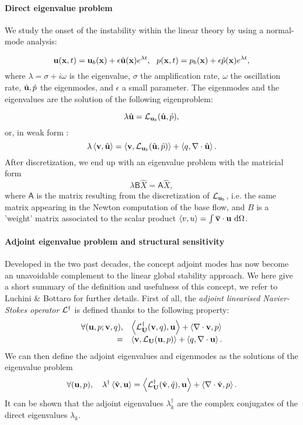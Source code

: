\documentclass[twocolumn,10pt]{asme2ej}
\newcommand{\be}[1]{ \begin{equation} \label{#1}}
\newcommand{\ee}{\end{equation}}
\newcommand{\bes}[1]{ \begin{equation} \label{#1}\begin{array}{rl}}
\newcommand{\ees}{\end{array}\end{equation}}
\begin{document}
\paragraph{Direct eigenvalue problem}
We study the onset of the instability within the linear theory by using a normal-mode analysis:

\be{startmodepropre}
{\bf u} ({\bf{x}},t) = {\bf u}_b({\bf{x}}) + \epsilon \hat{\bf u}({\bf{x}}) e^{\lambda t}, \,\,\,\, {p}({\bf{x}},t) = {p}_b({\bf{x}}) + \epsilon \hat{p}({\bf{x}}) e^{\lambda t},
\ee
where $\lambda = \sigma + i \omega$ is the eigenvalue, $\sigma$ the amplification rate,
$\omega$ the oscillation rate, $\hat{{\bf u}},\hat{p}$ the eigenmodes, and $\epsilon$ a small parameter.
The eigenmodes and the eigenvalues are the solution of the following eigenproblem:
 
\be{LEP}
\lambda \hat{{\bf u}} = {\cal L}_{{\bf u}_b}( \hat{\bf u},\hat{p}),
\ee
or, in weak form : 
\be{eigenvalueproblem}
\lambda \left< {\bf v} , \hat{{\bf u}} \right> = \left< {\bf v}, {\cal L}_{{\bf u}_b} ( \hat{\bf u},\hat{p})\right> + \left< q, \nabla \cdot \hat{\bf u} \right>.
\ee
After discretization, we end up with an eigenvalue problem with the matricial form
\be{Eigen_matricial}
\lambda {\mathsf{B}} \hat{X} = {\mathsf{A}} \hat{X},
\ee
{\color{red} where} ${\mathsf{A}}$ is the matrix resulting from the discretization of ${\cal L}_{{\bf u}_b}$, i.e. the same matrix  appearing in the Newton computation of the base flow, and  $B$ is a 'weight' matrix associated to the scalar product $\left<v,u\right> = \int \overline{\bf v} \cdot {\bf u} \mbox{ d} \Omega$.

\paragraph{Adjoint eigenvalue problem and structural sensitivity}
Developed in the two past decades, the concept adjoint modes has now become an unavoidable complement to the linear global stability approach. We here give a short summary of the definition and usefulness of this concept, 
we refer to Luchini \& Bottaro\cite{LucBott2014} for further details.
First of all, the {\em adjoint linearised Navier-Stokes operator} ${\cal L}^\dag$ is defined thanks to the following 
property:
\bes{NSLAdj}
\forall ( {\bf u}, p ; {\bf v}, q), & \left< {\cal L}^\dag_{\bf U}( {\bf v},q) ,{\bf u}\right> + \left< \nabla \cdot {\bf v},p\right>  \\
=& \left< {\bf v}, {\cal L}_{\bf U} ({\bf u},p)\right> + \left< q, \nabla \cdot {\bf u}\right>.
\ees
We can then define the adjoint eigenvalues and eigenmodes as the solutions of the eigenvalue problem 
\be{EigenAdj} 
\forall ( {\bf u}, p), \quad  \lambda^\dag \left< \hat{\bf v}, {\bf u}\right> =
 \left< {\cal L}^\dag_{\bf U}( \hat{\bf v},\hat{q}) ,{\bf u}\right> + \left< \nabla \cdot \hat{\bf v},p\right> . 
\ee
It can be shown \cite{SchmidHenningson2001} that the adjoint eigenvalues $\lambda^\dag_k$ are the complex conjugates of the direct eigenvalues $\lambda_k$. 
\end{document}
